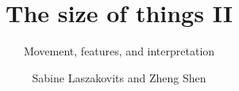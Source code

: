 \title{The size of \newlineCover things II}
\subtitle{Movement, features, and interpretation}
\author{Sabine Laszakovits and Zheng Shen}
\renewcommand{\lsSeries}{ogs}%
\renewcommand{\lsSeriesNumber}{}

%
%

\renewcommand{\lsCoverTitleFont}[1]{%
    \sffamily\addfontfeatures{Scale=MatchUppercase}%
    \fontsize{46pt}{15mm}\selectfont #1}

